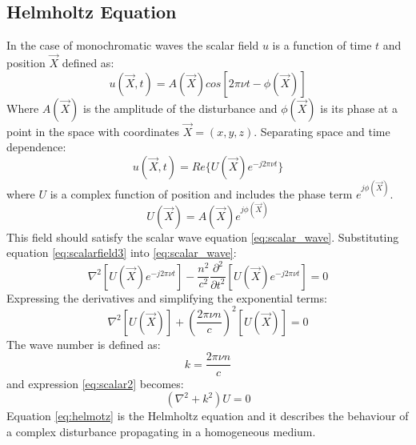 \subsection{Helmholtz Equation}
In the case of monochromatic waves the scalar field $u$ is a function of time $t$ and position $\overrightarrow{X}$ defined as:
\begin{equation}
\label{eq:scalarfield}
u(\overrightarrow{X},t)=A(\overrightarrow{X})cos[2\pi\nu t-\phi(\overrightarrow{X})]
\end{equation}
Where $A(\overrightarrow{X})$ is the amplitude of the disturbance and $\phi(\overrightarrow{X})$ is its phase at a point in the space with coordinates $\overrightarrow{X}=(x,y,z)$.
Separating space and time dependence:
\begin{equation}
\label{eq:scalarfield2}
u(\overrightarrow{X},t)=Re\{{U(\overrightarrow{X})e^{-j2\pi\nu t}}\}
\end{equation}
where $U$ is a complex function of position and includes the phase term $e^{j\phi(\overrightarrow{X})}$.
\begin{equation}
\label{eq:scalarfield3}
U(\overrightarrow{X})=A(\overrightarrow{X})e^{j\phi(\overrightarrow{X})}
\end{equation}
This field should satisfy the scalar wave equation \ref{eq:scalar_wave}. Substituting equation \ref{eq:scalarfield3} into \ref{eq:scalar_wave}:
\begin{equation}
\label{eq:scalar1}
	\nabla^2[U(\overrightarrow{X})e^{-j2\pi\nu t}]-\dfrac{n^2}{c^2}\dfrac{\partial^2}{\partial t^2}[U(\overrightarrow{X})e^{-j2\pi\nu t}]=0
\end{equation}
Expressing the derivatives and simplifying the exponential terms:
\begin{equation}
\label{eq:scalar2}
\nabla^2[U(\overrightarrow{X})]+ \left(\dfrac{2\pi\nu n}{c}\right)^2[U(\overrightarrow{X})]=0
\end{equation}
The wave number is defined as:
\begin{equation}
\label{eq:wavenumber}
	k=\dfrac{2\pi\nu n}{c}
\end{equation}
and expression \ref{eq:scalar2} becomes:
\begin{equation}
\label{eq:helmotz}
(\nabla^2+k^2)U=0	
\end{equation}
Equation \ref{eq:helmotz} is the Helmholtz equation and it describes the behaviour of a complex disturbance propagating in a homogeneous medium.
